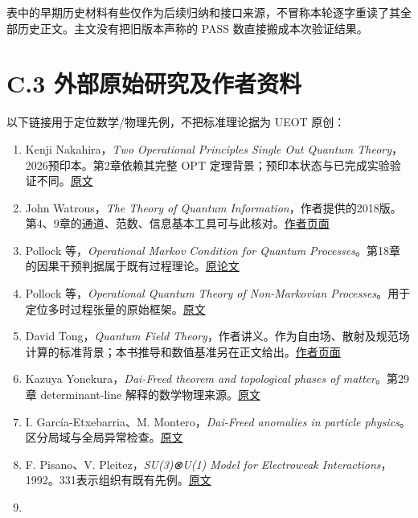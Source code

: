 \documentclass[
  11pt,
  oneside]{book}
\providecommand{\tightlist}{%
  \setlength{\itemsep}{0pt}\setlength{\parskip}{0pt}}
\begin{document}
表中的早期历史材料有些仅作为后续归纳和接口来源，不冒称本轮逐字重读了其全部历史正文。主文没有把旧版本声称的
PASS 数直接搬成本次验证结果。

\hypertarget{c.3-ux5916ux90e8ux539fux59cbux7814ux7a76ux53caux4f5cux8005ux8d44ux6599}{%
\section{C.3
外部原始研究及作者资料}\label{c.3-ux5916ux90e8ux539fux59cbux7814ux7a76ux53caux4f5cux8005ux8d44ux6599}}

以下链接用于定位数学/物理先例，不把标准理论据为 UEOT 原创：

\begin{enumerate}
\def\labelenumi{\arabic{enumi}.}
\tightlist
\item
  Kenji Nakahira，\emph{Two Operational Principles Single Out Quantum
  Theory}，2026预印本。第2章依赖其完整 OPT
  定理背景；预印本状态与已完成实验验证不同。\href{https://arxiv.org/abs/2605.23217}{原文}
\item
  John Watrous，\emph{The Theory of Quantum
  Information}，作者提供的2018版。第4、9章的通道、范数、信息基本工具可与此核对。\href{https://cs.uwaterloo.ca/~watrous/TQI/}{作者页面}
\item
  Pollock 等，\emph{Operational Markov Condition for Quantum
  Processes}。第18章的因果干预判据属于既有过程理论。\href{https://link.aps.org/doi/10.1103/PhysRevLett.120.040405}{原论文}
\item
  Pollock 等，\emph{Operational Quantum Theory of Non-Markovian
  Processes}。用于定位多时过程张量的原始框架。\href{https://arxiv.org/abs/1512.00589}{原文}
\item
  David Tong，\emph{Quantum Field
  Theory}，作者讲义。作为自由场、散射及规范场计算的标准背景；本书推导和数值基准另在正文给出。\href{https://www.damtp.cam.ac.uk/user/tong/qft.htm}{作者页面}
\item
  Kazuya Yonekura，\emph{Dai-Freed theorem and topological phases of
  matter}。第29章 determinant-line
  解释的数学物理来源。\href{https://arxiv.org/abs/1607.01873}{原文}
\item
  I. García-Etxebarria、M. Montero，\emph{Dai-Freed anomalies in
  particle
  physics}。区分局域与全局异常检查。\href{https://arxiv.org/abs/1808.00009}{原文}
\item
  F. Pisano、V. Pleitez，\emph{SU(3)⊗U(1) Model for Electroweak
  Interactions}，1992。331表示组织有既有先例。\href{https://arxiv.org/abs/hep-ph/9206242}{原文}
\item

\end{enumerate}
\end{document}
